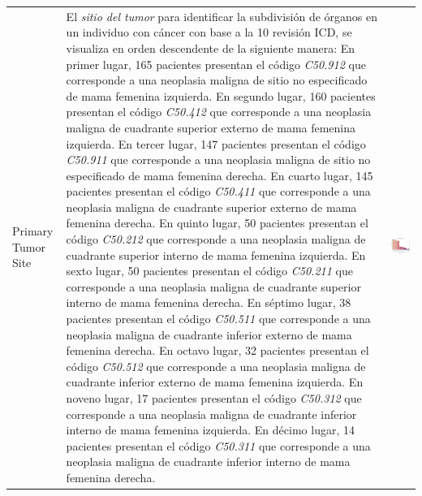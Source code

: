 \begin{table}[!htb]
\begin{threeparttable}
\begin{tabular}{p{2.5cm} p{7.5cm} p{6.5cm}}
			Primary Tumor Site
			& El \textit{sitio del tumor} para identificar la subdivisión de órganos en un individuo con cáncer con base a la 10 revisión ICD, se visualiza en orden descendente de la siguiente manera: En primer lugar, 165 pacientes presentan el código \textit{C50.912} que corresponde a una neoplasia maligna de sitio no especificado de mama femenina izquierda. En segundo lugar, 160 pacientes presentan el código \textit{C50.412} que corresponde a una neoplasia maligna de cuadrante superior externo de mama femenina izquierda. En tercer lugar, 147 pacientes presentan el código \textit{C50.911} que corresponde a una neoplasia maligna de sitio no especificado de mama femenina derecha. En cuarto lugar, 145 pacientes presentan el código \textit{C50.411} que corresponde a una neoplasia maligna de cuadrante superior externo de mama femenina derecha. En quinto lugar, 50 pacientes presentan el código \textit{C50.212} que corresponde a una neoplasia maligna de cuadrante superior interno de mama femenina izquierda. En sexto lugar, 50 pacientes presentan el código \textit{C50.211} que corresponde a una neoplasia maligna de cuadrante superior interno de mama femenina derecha. En séptimo lugar, 38 pacientes presentan el código \textit{C50.511} que corresponde a una neoplasia maligna de cuadrante inferior externo de mama femenina derecha. En octavo lugar, 32 pacientes presentan el código \textit{C50.512} que corresponde a una neoplasia maligna de cuadrante inferior externo de mama femenina izquierda. En noveno lugar, 17 pacientes presentan el código \textit{C50.312} que corresponde a una neoplasia maligna de cuadrante inferior interno de mama femenina izquierda. En décimo lugar, 14 pacientes presentan el código \textit{C50.311} que corresponde a una neoplasia maligna de cuadrante inferior interno de mama femenina derecha.        
			& \begin{center}\includegraphics[width=1\linewidth]{NOTEBOOK/IMAGENES_DESCRIPTIVAS/35_primary_tumor_site}\end{center}
			

\end{tabular}
\end{threeparttable}
\end{table}
